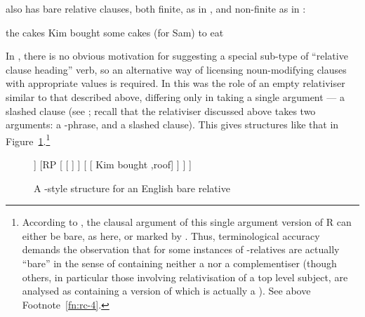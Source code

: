 \documentclass[output=paper,nonflat,draftmode]{./langsci/langscibook}
\begin{document}
 also has bare relative clauses, both finite, as in , and non-finite
as in :
\begin{exe}\ex\begin{xlist}\label{x:rc-88}
  \ex\label{x:rc-89} the cakes Kim bought \uGap
  \ex\label{x:rc-90} some cakes (for Sam) to eat \uGap
\end{xlist}\end{exe}
In , there is no obvious motivation for suggesting a special sub-type of ``relative
clause heading'' verb, so an alternative way of licensing noun-modifying clauses with
appropriate  values is required. In \cite{Pollard:Sag:94} this was the role
of an empty relativiser similar to that described above, differing only in taking a single
argument --- a slashed clause (see \citealt[222]{Pollard:Sag:94}; recall that the
relativiser discussed above takes two arguments: a -phrase, and a slashed
clause). This gives structures like that in Figure~\ref{fig:rc-7}.\footnote{According to
  \cite[222]{Pollard:Sag:94}, the clausal argument of this single argument version of R
  can either be bare, as here, or marked by . Thus, terminological accuracy
  demands the observation that for \citeauthor{Pollard:Sag:94} some instances of
  -relatives are actually ``bare'' in the sense of containing neither a  nor a complementiser (though others, in particular those involving
  relativisation of a top level subject, are analysed as containing a version of
   which is actually a ). See above Footnote~\ref{fn:rc-4}.}
\begin{figure}
    \begin{forest}  %
   [{\ibar{N}\subtag{1}} , baseline
      [{\idx{7}\ibar{N}\subtag{1}}  [ {cakes} ]  
      ]
      [{RP} 
            [{}     [ {\trace} ] ]
            [{}  [ {Kim bought} ,roof] ]
      ]
   ]
   \end{forest}
   \caption{A \cite{Pollard:Sag:94}-style structure for an English bare relative}
   \label{fig:rc-7}
\end{figure}
\end{document}
